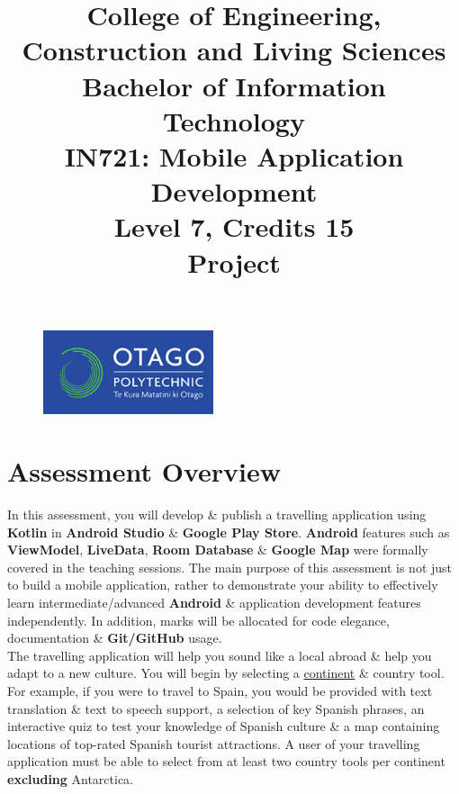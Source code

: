 \documentclass{article}
\author{}
\begin{document}
\begin{figure}
	\centering
	\includegraphics[width=50mm]{./img/logo.png}
\end{figure}

\title{College of Engineering, Construction and Living Sciences\\Bachelor of Information Technology\\IN721: Mobile Application Development\\Level 7, Credits 15\\\textbf{Project}}
\date{}
\maketitle

\section*{Assessment Overview}
In this assessment, you will develop \& publish a travelling application using \textbf{Kotlin} in \textbf{Android Studio} \& \textbf{Google Play Store}. \textbf{Android} features such as \textbf{ViewModel}, \textbf{LiveData}, \textbf{Room Database} \& \textbf{Google Map} were formally covered in the teaching sessions. The main purpose of this assessment is not just to build a mobile application, rather to demonstrate your ability to effectively learn intermediate/advanced \textbf{Android} \& application development features independently. In addition, marks will be allocated for code elegance, documentation \& \textbf{Git/GitHub} usage. \\

The travelling application will help you sound like a local abroad \& help you adapt to a new culture. You will begin by selecting a \href{https://www.worldometers.info/geography/7-continents/}{continent} \& country tool. For example, if you were to travel to Spain, you would be provided with text translation \& text to speech support, a selection of key Spanish phrases, an interactive quiz to test your knowledge of Spanish culture \& a map containing locations of top-rated Spanish tourist attractions. A user of your travelling application must be able to select from at least two country tools per continent \textbf{excluding} Antarctica. 
\end{document}
